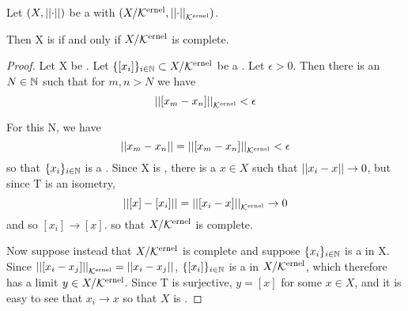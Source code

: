 \begin{prop}
\label{prop:quotientspreservecompleteness}
Let $(X,\left|\left| \cdot \right|\right|)$ be a \SeminormedSpace with \QuotientNormedSpace $(X/\bf\mathcal{K}\rm^{ernel}, \left|\left| \cdot \right|\right|_{\bf\mathcal{K}\rm^{ernel}})$. 

Then X is \PseudometricComplete if and only if $X/\bf\mathcal{K}\rm^{ernel}$ is complete. 

\begin{proof}
Let X be \PseudometricComplete. 
Let $\{[x_i]\}_{i \in \mathbb{N}} \subset X/\bf\mathcal{K}\rm^{ernel}$ be a \PseudometricCauchySequence. 
Let $\epsilon > 0$. 
Then there is an $N \in \mathbb{N}$ such that for $m,n > N$ we have 
\begin{equation}
\left|\left| [x_m-x_n] \right|\right|_{\bf\mathcal{K}\rm^{ernel}} < \epsilon
\end{equation}

For this N, we have 
\begin{equation}
\left|\left| x_m-x_n \right|\right| = \left|\left| [x_m-x_n] \right|\right|_{\bf\mathcal{K}\rm^{ernel}} < \epsilon
\end{equation}
so that $\{x_i\}_{i \in \mathbb{N}}$ is a \PseudometricCauchySequence. 
Since X is \PseudometricComplete, 
there is a 
$x \in X$ such that $\left|\left| x_i-x \right|\right| \to 0$, 
but since T is an isometry, 
\begin{equation}
\left|\left| [x]-[x_i] \right|\right|=\left|\left| [x_i-x] \right|\right|_{\bf\mathcal{K}\rm^{ernel}} \to 0
\end{equation}
and so 
$[x_i] \to [x]$.
so that $X/\bf\mathcal{K}\rm^{ernel}$ is complete. 

Now suppose instead that $X/\bf\mathcal{K}\rm^{ernel}$ is complete 
and suppose $\{x_i\}_{i \in \mathbb{N}}$ is a \PseudometricCauchySequence in X. 
Since $\left|\left| [x_i-x_j] \right|\right|_{\bf\mathcal{K}\rm^{ernel}} = \left|\left| x_i-x_j \right|\right|$, 
$\{[x_i]\}_{i \in \mathbb{N}}$ is a \PseudometricCauchySequence in $X/\bf\mathcal{K}\rm^{ernel}$, which therefore has a 
limit $y \in X/\bf\mathcal{K}\rm^{ernel}$. Since T is surjective, $y=[x]$ for some $x \in X$, and it is easy to see that
$x_i \to x$ so that $X$ is \PseudometricComplete. 

\end{proof}
\end{prop}

